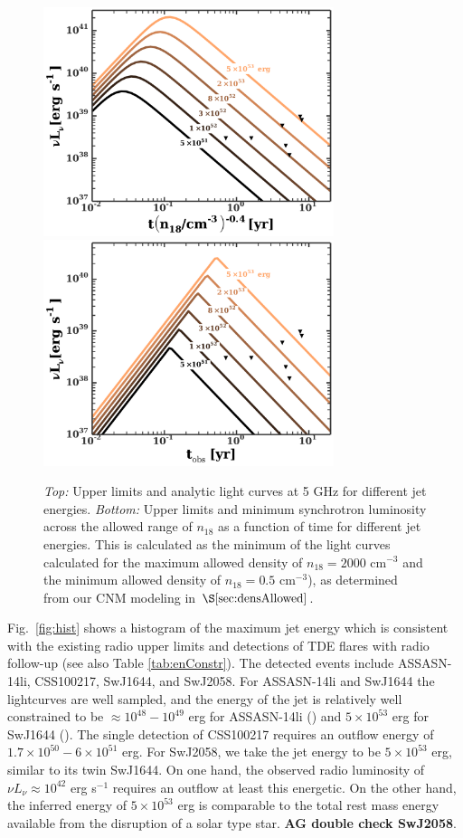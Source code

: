 \documentclass[usenatbib,fleqn]{mnras}
\begin{document}
\begin{figure}
\includegraphics[width=8.5cm]{e_contours1.pdf}
\includegraphics[width=8.5cm]{e_contours2.pdf}
\caption{\label{fig:econtours} {\it Top:} Upper limits and analytic
  light curves at 5 GHz for different jet energies.  {\it Bottom:}
  Upper limits and minimum synchrotron luminosity across the allowed
  range of $n_{18}$ as a function of time for different jet energies.
  This is calculated as the minimum of the light curves calculated for
  the maximum allowed density of $n_{18} = 2000$ cm$^{-3}$ and the
  minimum allowed density of $n_{18}= 0.5$ cm$^{-3}$), as determined
  from our CNM modeling in $\S\ref{sec:densAllowed}$.}
\end{figure}

Fig.~\ref{fig:hist} shows a histogram of the maximum jet energy which
is consistent with the existing radio upper limits and detections of
TDE flares with radio follow-up (see also Table \ref{tab:enConstr}).
The detected events include ASSASN-14li, CSS100217, SwJ1644, and
SwJ2058.  For ASSASN-14li and SwJ1644 the lightcurves are well
sampled, and the energy of the jet is relatively well constrained to
be $\approx 10^{48}-10^{49}$ erg for ASSASN-14li
(\citealt{van-Velzen+2015, Alexander+2015}) and $5\times 10^{53}$ erg
for SwJ1644 (\citealt{Mimica+2015}).  The single detection of
CSS100217 requires an outflow energy of $1.7\times 10^{50}-6\times
10^{51}$ erg.  For SwJ2058, we take the jet energy to be $5\times
10^{53}$ erg, similar to its twin SwJ1644.  On one hand, the observed
radio luminosity of $\nu L_{\nu }\approx 10^{42}$ erg s$^{-1}$
\citep{Cenko+2012} requires an outflow at least this energetic.  On
the other hand, the inferred energy of $5\times 10^{53}$ erg is
comparable to the total rest mass energy available from the disruption
of a solar type star. {\bf AG double check SwJ2058}.
\end{document}
